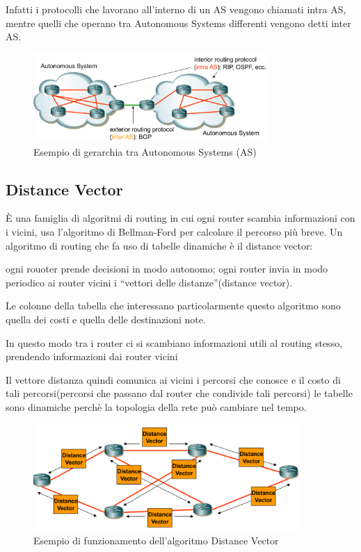 Infatti i protocolli che lavorano all'interno di un AS vengono chiamati intra AS, mentre quelli che operano tra Autonomous Systems differenti vengono detti inter AS.

\begin{figure}[h!]
    \centering
    \includegraphics[width=0.8\textwidth]{images/asgerarchia.png}
    \caption{Esempio di gerarchia tra Autonomous Systems (AS)}
    \label{fig:asgerarchia}
\end{figure}
\newpage
\subsection{Distance Vector}

È una famiglia di algoritmi di routing in cui ogni router scambia informazioni con i vicini, usa l'algoritmo di Bellman-Ford per calcolare il percorso più breve.
Un algoritmo di routing che fa uso di tabelle dinamiche è il distance vector:

ogni rouoter prende decisioni in modo autonomo; ogni router invia in modo periodico ai router vicini i “vettori delle distanze”(distance vector).

Le colonne della tabella che interessano particolarmente questo algoritmo sono quella dei costi e quella delle destinazioni note. 

In questo modo tra i router ci si scambiano informazioni utili al routing stesso, prendendo informazioni dai router vicini

Il vettore distanza quindi comunica ai vicini i percorsi che conosce e il costo di tali percorsi(percorsi che passano dal router che condivide tali percorsi)
le tabelle sono dinamiche perchè la topologia della rete può cambiare nel tempo.

\begin{figure}[h!]
    \centering
    \includegraphics[width=0.9\textwidth]{images/distancevector.png}
    \caption{Esempio di funzionamento dell'algoritmo Distance Vector}
    \label{fig:distancevector}
\end{figure}
\newpage
